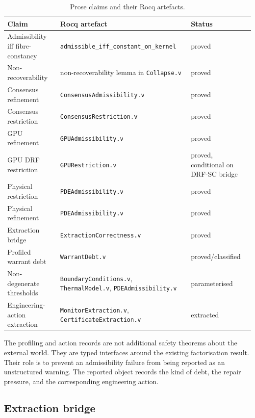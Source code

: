 \documentclass[a4paper,11pt]{article}
\begin{document}
\begin{table}[h]
\centering
\small
\begin{tabular}{p{3.5cm}p{4.5cm}p{2.6cm}}
\toprule
Claim & Rocq artefact & Status \\
\midrule
Admissibility iff fibre-constancy
  & \texttt{admissible\_iff\_\allowbreak{}constant\_on\_kernel}
  & proved \\[3pt]
Non-recoverability
  & non-recoverability lemma in \texttt{Collapse.v}
  & proved \\[3pt]
Consensus refinement
  & \texttt{ConsensusAdmissibility.v}
  & proved \\[3pt]
Consensus restriction
  & \texttt{ConsensusRestriction.v}
  & proved \\[3pt]
GPU refinement
  & \texttt{GPUAdmissibility.v}
  & proved \\[3pt]
GPU DRF restriction
  & \texttt{GPURestriction.v}
  & proved, conditional on DRF-SC bridge \\[3pt]
Physical restriction
  & \texttt{PDEAdmissibility.v}
  & proved \\[3pt]
Physical refinement
  & \texttt{PDEAdmissibility.v}
  & proved \\[3pt]
Extraction bridge
  & \texttt{ExtractionCorrectness.v}
  & proved \\[3pt]
Profiled warrant debt
  & \texttt{WarrantDebt.v}
  & proved/\allowbreak{}classified \\[3pt]
Non-degenerate thresholds
  & \texttt{BoundaryConditions.v}, \texttt{ThermalModel.v}, \texttt{PDEAdmissibility.v}
  & parameterised \\[3pt]
Engineering-action extraction
  & \texttt{MonitorExtraction.v}, \texttt{CertificateExtraction.v}
  & extracted \\
\bottomrule
\end{tabular}
\caption{Prose claims and their Rocq artefacts.}
\label{tab:code-claims}
\end{table}

The profiling and action records are not additional safety theorems about the
external world.  They are typed interfaces around the existing factorisation
result.  Their role is to prevent an admissibility failure from being reported
as an unstructured warning.  The reported object records the kind of debt, the
repair pressure, and the corresponding engineering action.

\subsection{Extraction bridge}
\label{subsec:extraction}
\end{document}
